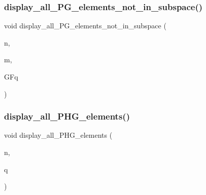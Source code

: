 \subsubsection{\texorpdfstring{display\+\_\+all\+\_\+\+P\+G\+\_\+elements\+\_\+not\+\_\+in\+\_\+subspace()}{display\_all\_PG\_elements\_not\_in\_subspace()}}
{\footnotesize\ttfamily void display\+\_\+all\+\_\+\+P\+G\+\_\+elements\+\_\+not\+\_\+in\+\_\+subspace (\begin{DoxyParamCaption}\item[{\mbox{\hyperlink{galois_8h_a09fddde158a3a20bd2dcadb609de11dc}{I\+NT}}}]{n,  }\item[{\mbox{\hyperlink{galois_8h_a09fddde158a3a20bd2dcadb609de11dc}{I\+NT}}}]{m,  }\item[{\mbox{\hyperlink{classfinite__field}{finite\+\_\+field}} \&}]{G\+Fq }\end{DoxyParamCaption})}

\mbox{\label{projective_8_c_a7d923a53ab2450e899269b1bfffffd1e}} 
\subsubsection{\texorpdfstring{display\+\_\+all\+\_\+\+P\+H\+G\+\_\+elements()}{display\_all\_PHG\_elements()}}
{\footnotesize\ttfamily void display\+\_\+all\+\_\+\+P\+H\+G\+\_\+elements (\begin{DoxyParamCaption}\item[{\mbox{\hyperlink{galois_8h_a09fddde158a3a20bd2dcadb609de11dc}{I\+NT}}}]{n,  }\item[{\mbox{\hyperlink{galois_8h_a09fddde158a3a20bd2dcadb609de11dc}{I\+NT}}}]{q }\end{DoxyParamCaption})}

\mbox{\label{projective_8_c_a9463b895dd45fc61cdc03df19f92b863}} 
